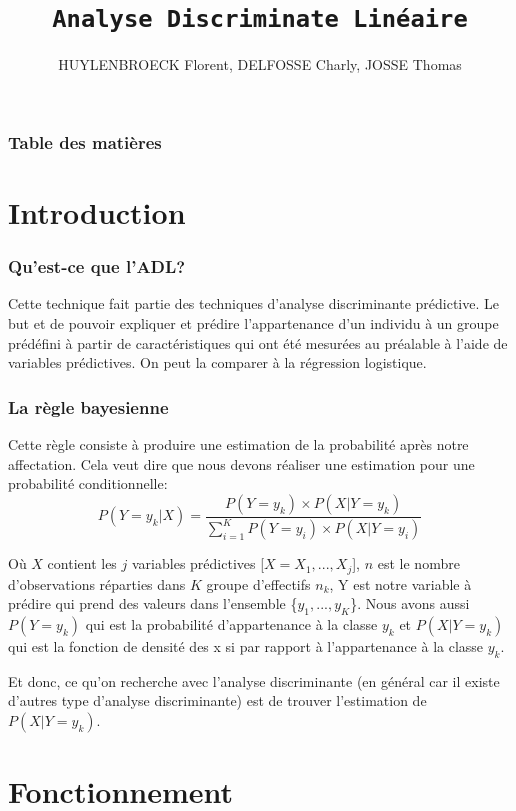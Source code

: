 \documentclass[b]{beamer}
\title{\texttt{Analyse Discriminate Linéaire}}
\author{HUYLENBROECK Florent, DELFOSSE Charly, JOSSE Thomas}
\begin{document}
	\begin{frame}
		\titlepage
	\end{frame}

	\begin{frame}
		\frametitle{Table des matières}
		\tableofcontents
	\end{frame}
	\section{Introduction}
	\begin{frame}
		\frametitle{Qu'est-ce que l'ADL?}
		Cette technique fait partie des techniques d'analyse discriminante prédictive. Le but et de pouvoir expliquer et prédire l'appartenance d'un individu à un groupe prédéfini à partir de caractéristiques qui ont été mesurées au préalable à l'aide de variables prédictives.
		On peut la comparer à la régression logistique. 
	\end{frame}
	\begin{frame}
		\frametitle{La règle bayesienne}
		Cette règle consiste à produire une estimation de la probabilité après notre affectation.
		Cela veut dire que nous devons réaliser une estimation pour une probabilité conditionnelle:
		\[
			P(Y = y_k | X) = \frac{P(Y = y_k) \times P(X| Y = y_k)}{\sum_{i=1}^{K} P(Y = y_i)\times P(X|Y = y_i)}
		\]
		
		Où $X$ contient les $j$ variables prédictives [$X = X_1,...,X_j$], $n$ est le nombre d'observations réparties dans $K$ groupe d'effectifs $n_k$, Y est notre variable à prédire qui prend des valeurs dans l'ensemble \{$y_1,...,y_K$\}. 
		Nous avons aussi $P(Y = y_k)$ qui est la probabilité d'appartenance à la classe $y_k$ et $P(X|Y = y_k)$ qui est la fonction de densité des x si par rapport à l'appartenance à la classe $y_k$.
	
		Et donc, ce qu'on recherche avec l'analyse discriminante (en général car il existe d'autres type d'analyse discriminante) est de trouver l'estimation de $P(X|Y = y_k)$.
	\end{frame}
	\section{Fonctionnement}
\end{document}
